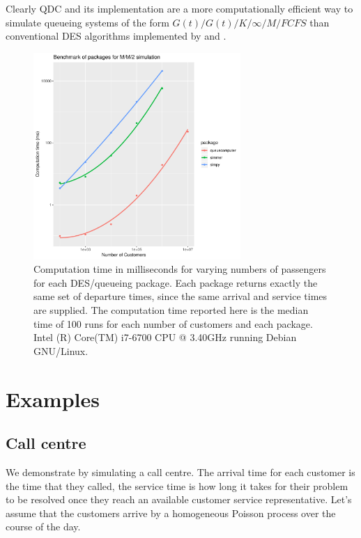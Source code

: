 \documentclass[article]{jss}
\begin{document}
Clearly QDC and its implementation  are a more computationally efficient way to simulate queueing systems of the form $G(t)/G(t)/K/\infty/M/FCFS$ than conventional DES algorithms implemented by  and . 

\begin{figure}[!htb]
  \centering
  \includegraphics[width = 0.7\textwidth]{figures/benchmark_083.pdf}
  \caption{Computation time in milliseconds for varying numbers of passengers for each DES/queueing package. Each package returns exactly the same set of departure times, since the same arrival and service times are supplied. The computation time reported here is the median time of 100 runs for each number of customers and each package. Intel (R) Core(TM) i7-6700
CPU @ 3.40GHz running Debian GNU/Linux.
 }
  \label{fig:bm_numberofpassengers}
\end{figure}

\newpage

\section{Examples} \label{sec:Examples}

\subsection{Call centre} \label{ssec:callcentre}

We demonstrate  by simulating a call centre. The arrival time for each customer is the time that they called, the service time is how long it takes for their problem to be resolved once they reach an available customer service representative. Let's assume that the customers arrive by a homogeneous Poisson process over the course of the day. 
\end{document}
